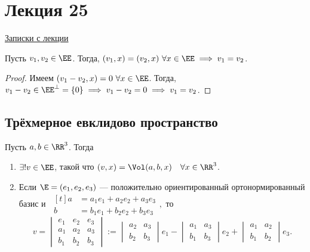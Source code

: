\section{Лекция 25} 

\href{https://www.dropbox.com/s/y3r4x7mjt7iv71a/%D0%9B%D0%90%D0%B8%D0%93_19-20_%D0%9B%D0%B5%D0%BA%D1%86%D0%B8%D1%8F_25.pdf?dl=0}{Записки с лекции}


\begin{lemma}
    Пусть $v_1, v_2 \in \EE$. Тогда, $(v_1, x) = (v_2, x) \ \forall x \in \EE \implies v_1 = v_2$.
\end{lemma}

\begin{proof}
    Имеем $(v_1 - v_2, x) = 0 \ \forall x \in \EE$.
    Тогда, $v_1 - v_2 \in \EE^{\perp} = \{0\} \implies v_1 - v_2 = 0 \implies v_1 = v_2$.
\end{proof}


\subsection{Трёхмерное евклидово пространство}

\begin{theorem}
    \label{lec25:t}
    Пусть $a, b \in \RR^3$. Тогда
    \begin{enumerate}
    \item $\exists! v \in \EE$, такой что $(v, x) = \Vol(a, b, x) \quad \forall x \in \RR^3$.
    \item Если $\E = (e_1, e_2, e_3)$ --- положительно ориентированный ортонормированный базис и
        \begin{math}
            \ \begin{aligned}[t]
                a &= a_1 e_1 + a_2 e_2 + a_3 e_3 \\
                b &= b_1 e_1 + b_2 e_2 + b_3 e_3
            \end{aligned},
        \end{math}
        то 
        \begin{equation}
            \tag{$\star$}
            \label{lec25:v}
            v = \begin{vmatrix}
                e_1 & e_2 & e_3 \\
                a_1 & a_2 & a_3 \\
                b_1 & b_2 & b_3
            \end{vmatrix}
            := \begin{vmatrix} 
                a_2 & a_3 \\
                b_2 & b_3
            \end{vmatrix} e_1 - \begin{vmatrix} 
                a_1 & a_3 \\
                b_1 & b_3
            \end{vmatrix} e_2 + \begin{vmatrix} 
                a_1 & a_2 \\
                b_1 & b_2
            \end{vmatrix} e_3
        .\end{equation}
    \end{enumerate}
\end{theorem}

